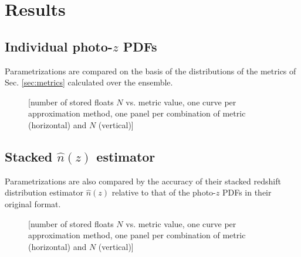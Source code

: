 \documentclass[\docopts]{\docclass}
\begin{document}
\section{Results}
\label{sec:results}

%

\subsection{Individual photo-$z$ PDFs}
\label{sec:individual}

Parametrizations are compared on the basis of the distributions of the metrics of Sec. \ref{sec:metrics} calculated over the ensemble.

\begin{figure}
  \caption{[number of stored floats $N$ vs. metric value, one curve per approximation method, one panel per combination of metric (horizontal) and $N$ (vertical)]
  \label{fig:individual}}
\end{figure}

\subsection{Stacked $\hat{n}(z)$ estimator}
\label{sec:stacked}

Parametrizations are also compared by the accuracy of their stacked redshift distribution estimator $\hat{n}(z)$ relative to that of the photo-$z$ PDFs in their original format.

\begin{figure}
  \caption{[number of stored floats $N$ vs. metric value, one curve per approximation method, one panel per combination of metric (horizontal) and $N$ (vertical)]
  \label{fig:stacked}}
\end{figure}


%
\end{document}
